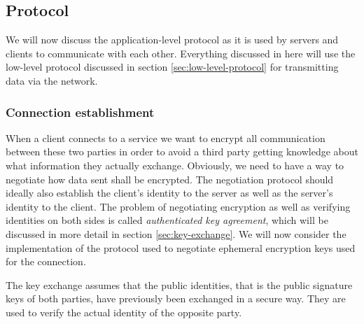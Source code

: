 \subsection{Protocol}
\label{sec:protocol}

We will now discuss the application-level protocol as it is used by servers and clients to communicate with each other.
Everything discussed in here will use the low-level protocol discussed in section \ref{sec:low-level-protocol} for transmitting data via the network.

\subsubsection{Connection establishment}
\label{sec:connection-establishment}

When a client connects to a service we want to encrypt all communication between these two parties in order to avoid a third party getting knowledge about what information they actually exchange.
Obviously, we need to have a way to negotiate how data sent shall be encrypted.
The negotiation protocol should ideally also establish the client's identity to the server as well as the server's identity to the client.
The problem of negotiating encryption as well as verifying identities on both sides is called \emph{authenticated key agreement}, which will be discussed in more detail in section \ref{sec:key-exchange}.
We will now consider the implementation of the protocol used to negotiate ephemeral encryption keys used for the connection.

The key exchange assumes that the public identities, that is the public signature keys of both parties, have previously been exchanged in a secure way.
They are used to verify the actual identity of the opposite party.

